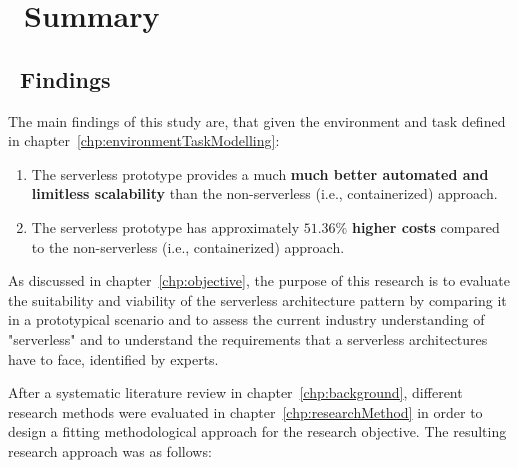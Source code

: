 \chapter{\ Summary}


\section{\ Findings}

The main findings of this study are, that given the environment and task defined in chapter~\vref{chp:environmentTaskModelling}: 

\begin{enumerate}[nolistsep]
    \item The serverless prototype provides a much \textbf{much better automated and limitless scalability} than the non-serverless (i.e., containerized) approach. 
    \item The serverless prototype has approximately $51.36\%$ \textbf{higher costs} compared to the non-serverless (i.e., containerized) approach. 
\end{enumerate}

As discussed in chapter~\vref{chp:objective}, the purpose of this research is to evaluate the suitability and viability of the serverless architecture pattern by comparing it in a prototypical scenario and to assess the current industry understanding of "serverless" and to understand the requirements that a serverless architectures have to face, identified by experts.\label{txt:objective}

After a systematic literature review in chapter~\vref{chp:background}, different research methods were evaluated in chapter~\vref{chp:researchMethod} in order to design a fitting methodological approach for the research objective. The resulting research approach was as follows:

